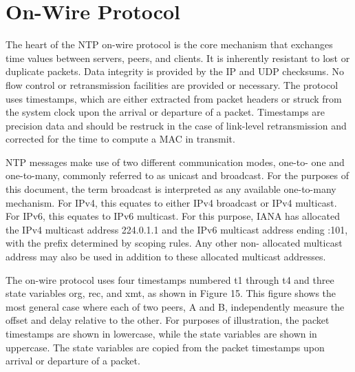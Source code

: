 \chapter{On-Wire Protocol}

The heart of the NTP on-wire protocol is the core mechanism that
exchanges time values between servers, peers, and clients. It is
inherently resistant to lost or duplicate packets. Data integrity is
provided by the IP and UDP checksums. No flow control or
retransmission facilities are provided or necessary. The protocol
uses timestamps, which are either extracted from packet headers or
struck from the system clock upon the arrival or departure of a
packet. Timestamps are precision data and should be restruck in the
case of link-level retransmission and corrected for the time to
compute a MAC in transmit.

NTP messages make use of two different communication modes, one-to-
one and one-to-many, commonly referred to as unicast and broadcast.
For the purposes of this document, the term broadcast is interpreted
as any available one-to-many mechanism. For IPv4, this equates to
either IPv4 broadcast or IPv4 multicast. For IPv6, this equates to
IPv6 multicast. For this purpose, IANA has allocated the IPv4
multicast address 224.0.1.1 and the IPv6 multicast address ending
:101, with the prefix determined by scoping rules. Any other non-
allocated multicast address may also be used in addition to these
allocated multicast addresses.

The on-wire protocol uses four timestamps numbered t1 through t4 and
three state variables org, rec, and xmt, as shown in Figure 15. This
figure shows the most general case where each of two peers, A and B,
independently measure the offset and delay relative to the other.
For purposes of illustration, the packet timestamps are shown in
lowercase, while the state variables are shown in uppercase. The
state variables are copied from the packet timestamps upon arrival or
departure of a packet.

